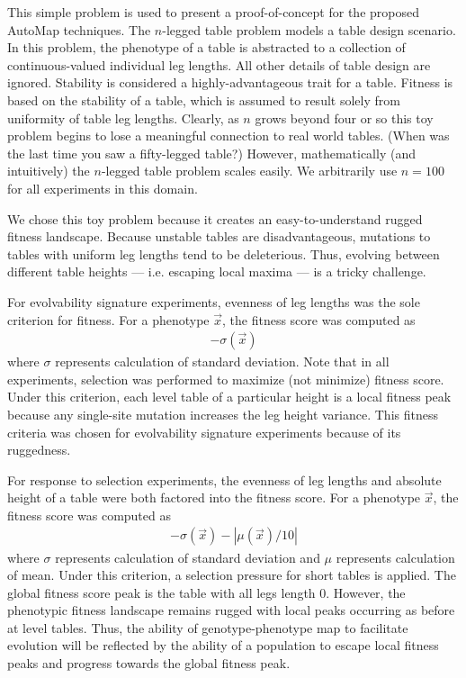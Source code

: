 This simple problem is used to present a proof-of-concept for the proposed AutoMap techniques.
The $n$-legged table problem models a table design scenario.
In this problem, the phenotype of a table is abstracted to a collection of continuous-valued individual leg lengths.
All other details of table design are ignored.
Stability is considered a highly-advantageous trait for a table.
Fitness is based on the stability of a table, which is assumed to result solely from uniformity of table leg lengths.
Clearly, as $n$ grows beyond four or so this toy problem begins to lose a meaningful connection to real world tables.
(When was the last time you saw a fifty-legged table?)
However, mathematically (and intuitively) the $n$-legged table problem scales easily.
We arbitrarily use $n=100$ for all experiments in this domain.

We chose this toy problem because it creates an easy-to-understand rugged fitness landscape.
Because unstable tables are disadvantageous, mutations to tables with uniform leg lengths tend to be deleterious.
Thus, evolving between different table heights --- i.e. escaping local maxima --- is a tricky challenge.

For evolvability signature experiments, evenness of leg lengths was the sole criterion for fitness.
For a phenotype $\vec{x}$, the fitness score was computed as
\begin{align*}
-\sigma(\vec{x})
\end{align*}
where $\sigma$ represents calculation of standard deviation.
Note that in all experiments, selection was performed to maximize (not minimize) fitness score.
Under this criterion, each level table of a particular height is a local fitness peak because any single-site mutation increases the leg height variance.
This fitness criteria was chosen for evolvability signature experiments because of its ruggedness.

For response to selection experiments, the evenness of leg lengths and absolute height of a table were both factored into the fitness score.
For a phenotype $\vec{x}$, the fitness score was computed as
\begin{align*}
-\sigma(\vec{x}) - |\mu(\vec{x})/10|
\end{align*}
where $\sigma$ represents calculation of standard deviation and $\mu$ represents calculation of mean.
Under this criterion, a selection pressure for short tables is applied.
The global fitness score peak is the table with all legs length 0.
However, the phenotypic fitness landscape remains rugged with local peaks occurring as before at level tables.
Thus, the ability of genotype-phenotype map to facilitate evolution will be reflected by the ability of a population to escape local fitness peaks and progress towards the global fitness peak.

